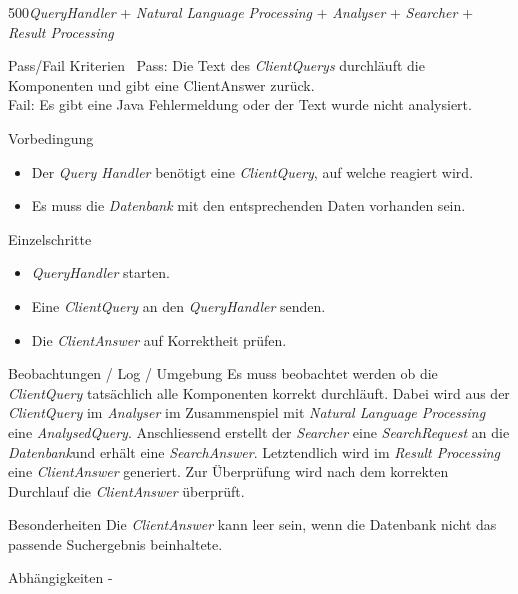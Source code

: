 \begin{testcase}{500}{\textit{QueryHandler} + \textit{Natural Language
Processing} +
\textit{Analyser} + \textit{Searcher} + \textit{Result Processing}}
\item[Pass/Fail Kriterien]\
Pass: Die Text des \textit{ClientQuerys} durchläuft die Komponenten und gibt
eine ClientAnswer zurück.\\
Fail: Es gibt eine Java Fehlermeldung oder der Text wurde nicht analysiert.
\item[Vorbedingung]
\begin{itemize} 
\item Der \textit{Query Handler} benötigt eine \textit{ClientQuery}, auf welche
reagiert wird.
\item Es muss die \textit{Datenbank} mit den entsprechenden Daten vorhanden
sein.
\end{itemize}
\item[Einzelschritte]
\begin{itemize}
\item \textit{QueryHandler} starten. 
\item Eine \textit{ClientQuery} an den \textit{QueryHandler} senden.
\item Die \textit{ClientAnswer} auf Korrektheit prüfen.
\end{itemize} 
\item[Beobachtungen / Log / Umgebung]
Es muss beobachtet werden ob die \textit{ClientQuery} tatsächlich alle Komponenten korrekt durchläuft. Dabei wird aus der \textit{ClientQuery} im \textit{Analyser} im Zusammenspiel mit \textit{Natural Language Processing} eine 
\textit{AnalysedQuery}. Anschliessend erstellt der \textit{Searcher} eine \textit{SearchRequest} an die \textit{Datenbank}und erhält eine \textit{SearchAnswer}. Letztendlich wird im \textit{Result Processing} eine \textit{ClientAnswer} generiert.
Zur Überprüfung wird nach dem korrekten Durchlauf die \textit{ClientAnswer}
überprüft.
\item[Besonderheiten]
Die \textit{ClientAnswer} kann leer sein, wenn die Datenbank nicht das
passende Suchergebnis beinhaltete.
\item[Abhängigkeiten] -
\end{testcase}

\pagebreak[2]

